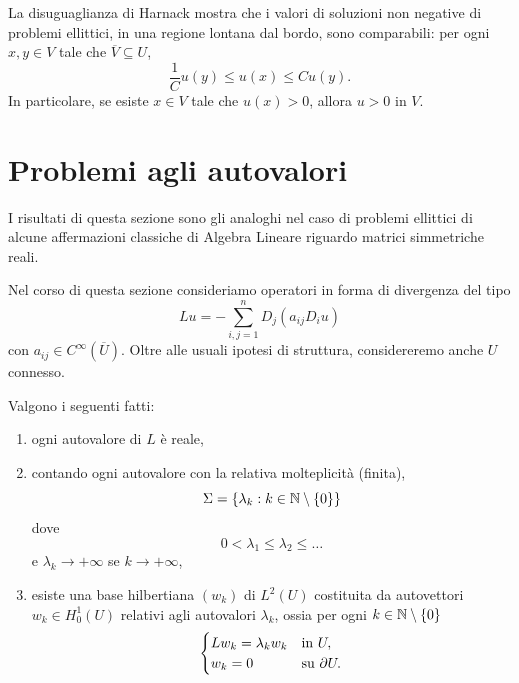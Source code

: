 \begin{osservazione}
	La disuguaglianza di Harnack mostra che i valori di soluzioni non negative di problemi ellittici, in una regione lontana dal bordo, sono comparabili: per ogni $x,y \in V$ tale che $\overline{V} \subseteq U$, 
	\[ \frac{1}{C} u(y) \le u(x) \le Cu(y). \]
	In particolare, se esiste $x \in V$ tale che $u(x) >0$, allora $u> 0$ in $V$.
\end{osservazione}
\section{Problemi agli autovalori}
I risultati di questa sezione sono gli analoghi nel caso di problemi ellittici di alcune affermazioni classiche di Algebra Lineare riguardo matrici simmetriche reali.

Nel corso di questa sezione consideriamo operatori in forma di divergenza del tipo 
\[ Lu = -\sum_{i,j=1}^{n}D_{j}(a_{ij}D_iu)\]
con $a_{ij} \in C^\infty(\overline{U})$. Oltre alle usuali ipotesi di struttura, considereremo anche $U$ connesso.
\begin{teorema}
	Valgono i seguenti fatti:
	\begin{enumerate}[$(a)$]
		\item ogni autovalore di $L$ è reale,
		\item contando ogni autovalore con la relativa molteplicità (finita), 
		\[ \Sigma = \left\lbrace \lambda_k : k \in \mathbb{N}\setminus\left\lbrace 0\right\rbrace \right\rbrace  \]
		dove 
		\[ 0 < \lambda_1 \le \lambda_2 \le \dots \]
		e $\lambda_k \to +\infty$ se $k \to +\infty$,
		\item esiste una base hilbertiana $(w_k)$ di $L^2(U)$ costituita da autovettori $w_{k} \in H^1_0(U)$ relativi agli autovalori $\lambda_k$, ossia per ogni $k \in \mathbb{N}\setminus\left\lbrace 0\right\rbrace$
		\[ \begin{cases}
			Lw_k = \lambda_k w_k & \textup{in } U,\\
			w_k = 0 & \textup{su } \partial U.
		\end{cases} \]
	\end{enumerate}
\end{teorema}
